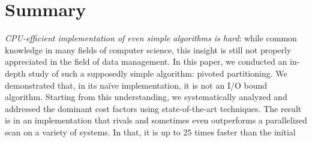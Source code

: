 \section{Summary}
\label{subsec:damon_conclusion}
\emph{CPU-efficient implementation of even simple algorithms is hard}:
while common knowledge in many fields of computer science, this
insight is still not properly appreciated in the field of data
management. In this paper, we conducted an in-depth study of such a
supposedly simple algorithm: pivoted partitioning. We demonstrated
that, in its na\"ive implementation, it is not an I/O bound
algorithm. Starting from this understanding, we systematically
analyzed and addressed the dominant cost factors using
state-of-the-art techniques. The result is in an implementation that
rivals and sometimes even outperforms a parallelized scan on a variety of
systems. In that, it is up to 25 times faster than the initial

